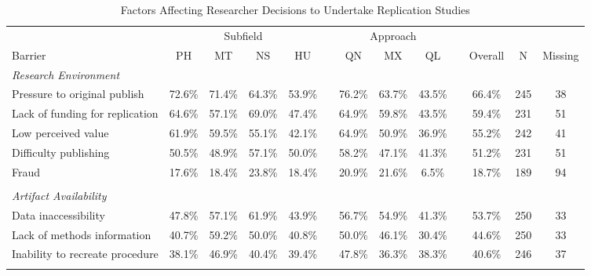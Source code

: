 \documentclass[]{interact}
\theoremstyle{plain}%
\theoremstyle{definition}
\theoremstyle{remark}
\begin{document}
\newpage


\newpage
\begin{landscape}
\begin{table}[h]
    \centering
    \begin{threeparttable}
    \caption{Factors Affecting Researcher Decisions to Undertake Replication Studies }
    \begin{tabular}{l c c c c c c c c c c c c}
         \hline
                    & \multicolumn{4}{1}{Subfield}  & & \multicolumn{3}{1}{Approach} & & & & \\
         Barrier    & PH & MT & NS & HU            & & QN & MX & QL              & & Overall & N & Missing\\
         \hline
         \textit{Research Environment}      & & & & & & & & & & \\
         Pressure to original publish       & 72.6\% & 71.4\% & 64.3\% & 53.9\% & & 76.2\% & 63.7\% & 43.5\% & & 66.4\% & 245 & 38 \\
         Lack of funding for replication    & 64.6\% & 57.1\% & 69.0\% & 47.4\% & & 64.9\% & 59.8\% & 43.5\% & & 59.4\% & 231 & 51 \\
         Low perceived value                & 61.9\% & 59.5\% & 55.1\% & 42.1\% & & 64.9\% & 50.9\% & 36.9\% & & 55.2\% & 242 & 41 \\
         Difficulty publishing              & 50.5\% & 48.9\% & 57.1\% & 50.0\% & & 58.2\% & 47.1\% & 41.3\% & & 51.2\% & 231 & 51 \\
         Fraud                              & 17.6\% & 18.4\% & 23.8\% & 18.4\% & & 20.9\% & 21.6\% & 6.5\%  & & 18.7\% & 189 & 94 \\
                                            & & & & & & & & & & & & \\
         \textit{Artifact Availability}     & & & & & & & & & & & & \\
         Data inaccessibility               & 47.8\% & 57.1\% & 61.9\% & 43.9\% & & 56.7\% & 54.9\% & 41.3\% & & 53.7\% & 250 & 33 \\
         Lack of methods information        & 40.7\% & 59.2\% & 50.0\% & 40.8\% & & 50.0\% & 46.1\% & 30.4\% & & 44.6\% & 250 & 33 \\
         Inability to recreate procedure    & 38.1\% & 46.9\% & 40.4\% & 39.4\% & & 47.8\% & 36.3\% & 38.3\% & & 40.6\% & 246 & 37 \\
                                            & & & & & & & & & & & & \\

\end{tabular}
\end{threeparttable}
\end{table}
\end{landscape}
\end{document}
